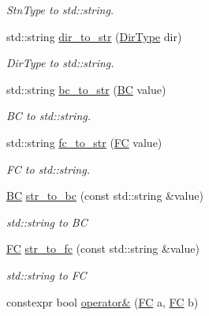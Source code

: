 \begin{DoxyCompactItemize}
\begin{DoxyCompactList}\small\item\em Stn\+Type to std\+::string. \end{DoxyCompactList}\item 
std\+::string \hyperlink{namespaceUintah_1_1PhaseField_a210a65278fe4cc9c19a428de018272ec}{dir\+\_\+to\+\_\+str} (\hyperlink{namespaceUintah_1_1PhaseField_a94555da848596a419ae2c0e32649e1dc}{Dir\+Type} dir)
\begin{DoxyCompactList}\small\item\em Dir\+Type to std\+::string. \end{DoxyCompactList}\item 
std\+::string \hyperlink{namespaceUintah_1_1PhaseField_ad205f402e20ed9209f12265147bd4e5c}{bc\+\_\+to\+\_\+str} (\hyperlink{namespaceUintah_1_1PhaseField_a148fba372aa3be96fd6eede7a2fa10b5}{BC} value)
\begin{DoxyCompactList}\small\item\em BC to std\+::string. \end{DoxyCompactList}\item 
std\+::string \hyperlink{namespaceUintah_1_1PhaseField_a3efdada0de283a3b4482293537e59452}{fc\+\_\+to\+\_\+str} (\hyperlink{namespaceUintah_1_1PhaseField_aeb51fe956fe07f1487f5878f4039f27c}{FC} value)
\begin{DoxyCompactList}\small\item\em FC to std\+::string. \end{DoxyCompactList}\item 
\hyperlink{namespaceUintah_1_1PhaseField_a148fba372aa3be96fd6eede7a2fa10b5}{BC} \hyperlink{namespaceUintah_1_1PhaseField_ae111bd8827ecc139cc3c88e52ceb141d}{str\+\_\+to\+\_\+bc} (const std\+::string \&value)
\begin{DoxyCompactList}\small\item\em std\+::string to BC \end{DoxyCompactList}\item 
\hyperlink{namespaceUintah_1_1PhaseField_aeb51fe956fe07f1487f5878f4039f27c}{FC} \hyperlink{namespaceUintah_1_1PhaseField_a1b73af9bf55d015e399d292360fd700b}{str\+\_\+to\+\_\+fc} (const std\+::string \&value)
\begin{DoxyCompactList}\small\item\em std\+::string to FC \end{DoxyCompactList}\item 
constexpr bool \hyperlink{namespaceUintah_1_1PhaseField_a98ea8b8abff26138762ce1898ce6c424}{operator\&} (\hyperlink{namespaceUintah_1_1PhaseField_aeb51fe956fe07f1487f5878f4039f27c}{FC} a, \hyperlink{namespaceUintah_1_1PhaseField_aeb51fe956fe07f1487f5878f4039f27c}{FC} b)

\end{DoxyCompactItemize}
